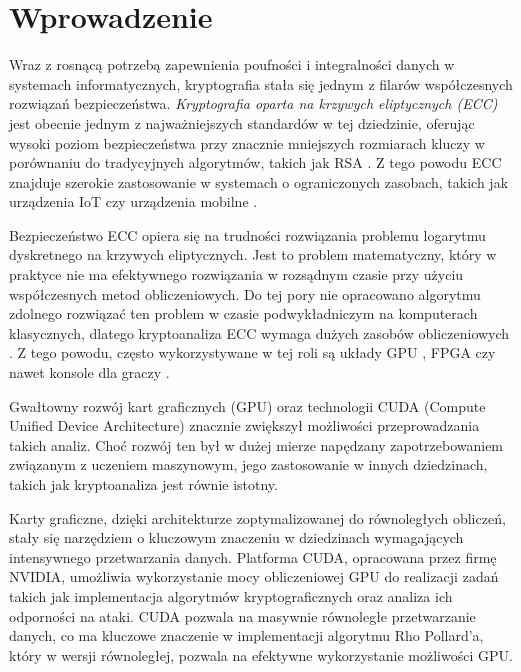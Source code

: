 \newpage
\section{Wprowadzenie}

Wraz z rosnącą potrzebą zapewnienia poufności i integralności danych w systemach
informatycznych, kryptografia stała się jednym z filarów współczesnych rozwiązań
bezpieczeństwa. \textit{Kryptografia oparta na krzywych eliptycznych (ECC)} jest
obecnie jednym z najważniejszych standardów w tej dziedzinie, oferując wysoki
poziom bezpieczeństwa przy znacznie mniejszych rozmiarach kluczy w porównaniu
do tradycyjnych algorytmów, takich jak RSA \cite[]{Ao2016,Barker2016}.
Z tego powodu ECC znajduje szerokie zastosowanie w systemach o ograniczonych zasobach, takich
jak urządzenia IoT czy urządzenia mobilne \cite[]{Thakur2022,Hammi2020}.

Bezpieczeństwo ECC opiera się na trudności rozwiązania problemu logarytmu
dyskretnego na krzywych eliptycznych. Jest to problem matematyczny, który w
praktyce nie ma efektywnego rozwiązania w rozsądnym czasie przy użyciu
współczesnych metod obliczeniowych. Do tej pory nie opracowano algorytmu
zdolnego rozwiązać ten problem w czasie podwykładniczym na komputerach klasycznych, dlatego
kryptoanaliza ECC wymaga dużych zasobów obliczeniowych \cite{Menezes2001}.
Z tego powodu, często wykorzystywane w tej roli są układy GPU \cite[]{Boss2015,Panetta2017,Bernstein2012},
FPGA \cite[]{Wenger2014,Mane2011,FPGA2008,Majkowski2008}
czy nawet konsole dla graczy \cite{Bos2010}.

Gwałtowny rozwój kart graficznych (GPU) oraz technologii CUDA
(Compute Unified Device Architecture) znacznie zwiększył możliwości
przeprowadzania takich analiz. Choć rozwój ten był w dużej mierze napędzany
zapotrzebowaniem związanym z uczeniem maszynowym, jego zastosowanie w
innych dziedzinach, takich jak kryptoanaliza jest równie istotny.

Karty graficzne, dzięki architekturze zoptymalizowanej do równoległych obliczeń,
stały się narzędziem o kluczowym znaczeniu w dziedzinach wymagających intensywnego
przetwarzania danych. Platforma CUDA, opracowana przez firmę NVIDIA, umożliwia
wykorzystanie mocy obliczeniowej GPU do realizacji zadań takich jak
implementacja algorytmów kryptograficznych oraz analiza ich odporności na ataki.
CUDA pozwala na masywnie równoległe przetwarzanie danych, co ma kluczowe znaczenie
w implementacji algorytmu Rho Pollard'a, który w wersji równoległej, pozwala na efektywne
wykorzystanie możliwości GPU.

